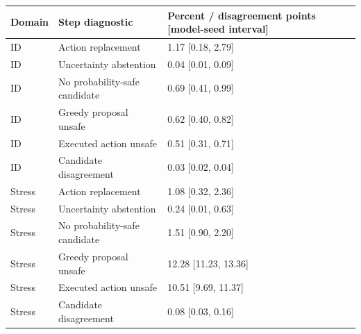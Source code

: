 \begin{tabular}{lll}
\toprule
Domain & Step diagnostic & Percent / disagreement points [model-seed interval] \\
\midrule
ID & Action replacement & 1.17 [0.18, 2.79] \\
ID & Uncertainty abstention & 0.04 [0.01, 0.09] \\
ID & No probability-safe candidate & 0.69 [0.41, 0.99] \\
ID & Greedy proposal unsafe & 0.62 [0.40, 0.82] \\
ID & Executed action unsafe & 0.51 [0.31, 0.71] \\
ID & Candidate disagreement & 0.03 [0.02, 0.04] \\
Stress & Action replacement & 1.08 [0.32, 2.36] \\
Stress & Uncertainty abstention & 0.24 [0.01, 0.63] \\
Stress & No probability-safe candidate & 1.51 [0.90, 2.20] \\
Stress & Greedy proposal unsafe & 12.28 [11.23, 13.36] \\
Stress & Executed action unsafe & 10.51 [9.69, 11.37] \\
Stress & Candidate disagreement & 0.08 [0.03, 0.16] \\
\bottomrule
\end{tabular}
